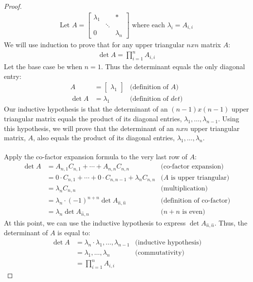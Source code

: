\documentclass[12pt,reqno]{article}
\theoremstyle{definition}
\begin{document}
\begin{proof}
    \begin{align*}
        \text{Let } A =
        \begin{bmatrix}
            \lambda_1 &  & *\\
             & \ddots & \\
             0 &  & \lambda_n
        \end{bmatrix}
        \text{ where each $\lambda_i = A_{i,i}$}
    \end{align*}
    We will use induction to prove that for any upper triangular $nxn$ matrix $A$:
    \begin{align*}
        \det A = \prod_{i = 1}^n A_{i,i}
    \end{align*}
    Let the base case be when $n=1$. Thus the determinant equals the only diagonal entry:
    \begin{align*}
        A &= 
        \begin{bmatrix}
           \lambda_1 
        \end{bmatrix}
        & \text{(definition of $A$)}\\
        \det A &= \lambda_1 & \text{(definition of $det$)}
    \end{align*}
    Our inductive hypothesis is that the determinant of an $(n-1)x(n-1)$ upper triangular matrix equals the product of its diagonal entries, $\lambda_1,\ldots,\lambda_{n-1}$. 
    Using this hypothesis, we will prove that the determinant of an $nxn$ upper triangular matrix, $A$, also equals the product of its diagonal entries, $\lambda_1,\ldots,\lambda_n$.
    \\\\
    Apply the co-factor expansion formula to the very last row of $A$:
    \begin{align*}
        \det A &= A_{n,1}C_{n,1}+\cdots+A_{n,n}C_{n,n} & \text{(co-factor expansion)}\\
        &= 0\cdot C_{n,1} + \cdots + 0\cdot C_{n,n-1} + \lambda_n C_{n,n} & \text{($A$ is upper triangular)}\\
        &= \lambda_n C_{n,n} & \text{(multiplication)}\\
        &= \lambda_n \cdot (-1)^{n+n} \det  A_{\hat{n},\hat{n}} & \text{(definition of co-factor)}\\
        &= \lambda_n \det  A_{\hat{n},\hat{n}} & \text{($n+n$ is even)}
    \end{align*}
    At this point, we can use the inductive hypothesis to express $\det A_{\hat{n},\hat{n}}$. Thus, the determinant of $A$ is equal to:
    \begin{align*}
        \det A &= \lambda_n \cdot \lambda_1,\ldots,\lambda_{n-1} & \text{(inductive hypothesis)}\\
        &= \lambda_1,\ldots,\lambda_n & \text{(commutativity)}\\
        &= \prod_{i=1}^{n}A_{i,i}
    \end{align*}
    
\end{proof}
\end{document}
